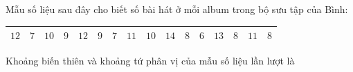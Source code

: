 \begin{ex}
Mẫu số liệu sau đây cho biết số bài hát ở mỗi album trong bộ sưu tập của Bình:
\begin{center}
\begin{tabular}{|c|c|c|c|c|c|c|c|c|c|c|c|c|c|c|c|}\hline
$12$ & $7$ & $10$ & $9$ & $12$ & $9$ & $7$ & $11$ & $10$ & $14$ & $8$ & $6$ & $13$ & $8$ & $11$ & $8$\\\hline
\end{tabular}
\end{center}
Khoảng biến thiên và khoảng tứ phân vị của mẫu số liệu lần lượt là
\end{ex}
